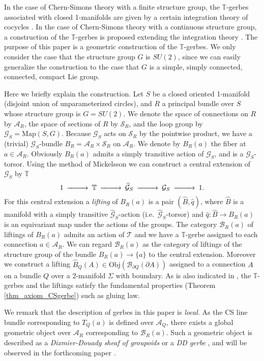 \documentclass[a4paper,a4paper]{article}
\theoremstyle{definition}
\theoremstyle{remark}
\newcommand{\T}{\mathbb{T}}
\newcommand{\A}{\mathcal{A}}
\newcommand{\B}{\mathcal{B}}
\newcommand{\G}{\mathcal{G}}
\newcommand{\sT}{\mathcal{T}}
\newcommand{\hq}{\widehat{q}}
\renewcommand{\S}{\mathcal{S}}
\def\h#1{ \widehat{#1} }
\def\M#1{ \mathrm{Map}({#1},G) }
\begin{document}
In the case of Chern-Simons theory with a finite structure group, the $\T$-gerbes associated with closed 1-manifolds are given by a certain integration theory of cocycles \cite{F2}. In the case of Chern-Simons theory with a continuous structure group, a construction of the $\T$-gerbes is proposed extending the integration theory \cite{F3, F4}. The purpose of this paper is a geometric construction of the $\T$-gerbes. We only consider the case that the structure group $G$ is $SU(2)$, since we can easily generalize the construction to the case that $G$ is a simple, simply connected, connected, compact Lie group.

Here we briefly explain the construction. Let $S$ be a closed oriented 1-manifold (disjoint union of unparameterized circles), and $R$ a principal bundle over $S$ whose structure group is $G = SU(2)$. We denote the space of connections on $R$ by $\A_R$, the space of sections of $R$ by $\S_R$, and the loop group \cite{P-S} by $\G_S = \M{S}$. Because $\G_S$ acts on $\S_R$ by the pointwise product, we have a (trivial) $\G_S$-bundle $B_R = \A_R \times \S_R$ on $\A_R$. We denote by $B_R(a)$ the fiber at $a \in \A_R$. Obviously $B_R(a)$ admits a simply transitive action of $\G_S$, and is a $\G_S$-torsor. Using the method of Mickelsson \cite{Mi} we can construct a central extension of $\G_S$ by $\T$
$$
\begin{CD}
1 @>>> \T @>>> \h{\G}_S @>>> \G_S @>>> 1.
\end{CD}
$$
For this central extension a \textit{lifting} of $B_R(a)$ is a pair $(\h{B}, \hq)$, where $\h{B}$ is a manifold with a simply transitive $\h{\G}_S$-action (i.e.\ $\h{\G}_S$-torsor) and $\hq : \h{B} \to B_R(a)$ is an equivariant map under the actions of the groups. The category $\B_R(a)$ of liftings of $B_R(a)$ admits an action of $\sT$ and we have a $\T$-gerbe assigned to each connection $a \in \A_R$. We can regard $\B_R(a)$ as the category of liftings of the structure group of the bundle $B_R(a) \to \{a\}$ to the central extension. Moreover we construct a lifting $\h{B}_Q(A) \in \textrm{Obj}(\B_{\partial Q}(\partial A))$ assigned to a connection $A$ on a bundle $Q$ over a 2-manifold $\Sigma$ with boundary. As is also indicated in \cite{F2}, the $\T$-gerbes and the liftings satisfy the fundamental properties (Theorem \ref{thm_axiom_CSgerbe}) such as gluing law.

We remark that the description of gerbes in this paper is \textit{local}. As the CS line bundle corresponding to $T_Q(a)$ is defined over $\A_Q$, there exists a global geometric object over $\A_R$ corresponding to $\B_R(a)$. Such a geometric object is described as a \textit{Dixmier-Douady sheaf of groupoids} or a \textit{DD gerbe} \cite{Br1,Br2}, and will be observed in the forthcoming paper \cite{Go}.
\end{document}
